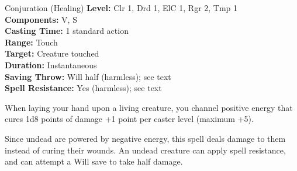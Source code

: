 {Conjuration (Healing)}
{
	\textbf{Level:}
	Clr 1, Drd 1, ElC 1, Rgr 2, Tmp 1\\
	\textbf{Components:}
	V, S\\
	\textbf{Casting Time:}
	1 standard action\\
	\textbf{Range:}
	Touch\\
	\textbf{Target:}
	Creature touched\\
	\textbf{Duration:}
	Instantaneous\\
	\textbf{Saving Throw:}
	Will half (harmless); see text\\
	\textbf{Spell Resistance:}
	Yes (harmless); see text\\
}
{
	When laying your hand upon a living creature, you channel positive energy that cures 1d8 points of damage +1 point per caster level (maximum +5).

	Since undead are powered by negative energy, this spell deals damage to them instead of curing their wounds. An undead creature can apply spell resistance, and can attempt a Will save to take half damage.

}

